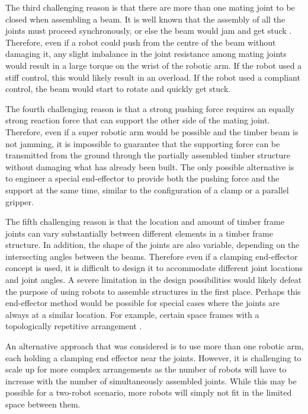 The third challenging reason is that there are more than one mating joint to be closed when assembling a beam. It is well known that the assembly of all the joints must proceed synchronously, or else the beam would jam and get stuck \parencite{dupontJammingWedgingConstrained1994}. Therefore, even if a robot could push from the centre of the beam without damaging it, any slight imbalance in the joint resistance among mating joints would result in a large torque on the wrist of the robotic arm. If the robot used a stiff control, this would likely result in an overload. If the robot used a compliant control, the beam would start to rotate and quickly get stuck. 

The fourth challenging reason is that a strong pushing force requires an equally strong reaction force that can support the other side of the mating joint. Therefore, even if a super robotic arm would be possible and the timber beam is not jamming, it is impossible to guarantee that the supporting force can be transmitted from the ground through the partially assembled timber structure without damaging what has already been built. The only possible alternative is to engineer a special end-effector to provide both the pushing force and the support at the same time, similar to the configuration of a clamp or a parallel gripper.

The fifth challenging reason is that the location and amount of timber frame joints can vary substantially between different elements in a timber frame structure. In addition, the shape of the joints are also variable, depending on the intersecting angles between the beams. Therefore even if a clamping end-effector concept is used, it is difficult to design it to accommodate different joint locations and joint angles. A severe limitation in the design possibilities would likely defeat the purpose of using robots to assemble structures in the first place. Perhaps this end-effector method would be possible for special cases where the joints are always at a similar location. For example, certain space frames with a topologically repetitive arrangement \parencite{apolinarskaRoboticAssemblyTimber2021, willmannNewParadigmsAutomatic2016}. 

An alternative approach that was considered is to use more than one robotic arm, each holding a clamping end effector near the joints. However, it is challenging to scale up for more complex arrangements as the number of robots will have to increase with the number of simultaneously assembled joints. While this may be possible for a two-robot scenario, more robots will simply not fit in the limited space between them.

